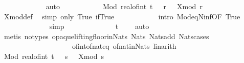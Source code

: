\begin{isabellebody}
\ \ \ \ \ \ \ \ \ \ \ \isamarkupfalse%
\ auto\isanewline
\ \ \ \ \ \ \ \ \isamarkupfalse%
\ \isamarkupfalse%
\ {\isachardoublequoteopen}{\isacharparenleft}{\kern0pt}Mod\ {\isacharparenleft}{\kern0pt}real{\isacharunderscore}{\kern0pt}of{\isacharunderscore}{\kern0pt}int\ {\isasymlfloor}t{\isasymrfloor}\ {\isacharplus}{\kern0pt}\ {}{\isacharparenright}{\kern0pt}{\isacharparenright}{\kern0pt}\ r\ {\isasymomega}\ {\isacharequal}{\kern0pt}\ X{\isacharunderscore}{\kern0pt}mod\ r\ {\isasymomega}{\isachardoublequoteclose}\isanewline
\ \ \ \ \ \ \ \ \ \ \isamarkupfalse%
\ X{\isacharunderscore}{\kern0pt}mod{\isacharunderscore}{\kern0pt}def\ \isamarkupfalse%
\ {\isacharparenleft}{\kern0pt}simp\ only{\isacharcolon}{\kern0pt}\ True\ if{\isacharunderscore}{\kern0pt}True{\isacharparenright}{\kern0pt}\isanewline
\ \ \ \ \ \ \ \ \ \ \isamarkupfalse%
\ {\isacharparenleft}{\kern0pt}intro\ Mod{\isacharunderscore}{\kern0pt}eq{\isacharunderscore}{\kern0pt}N{\isacharunderscore}{\kern0pt}inf{\isacharbrackleft}{\kern0pt}OF\ True{\isacharbrackright}{\kern0pt}{\isacharparenright}{\kern0pt}\isanewline
\ \ \ \ \ \ \ \ \ \ \ \ \isamarkupfalse%
\ simp\isanewline
\ \ \ \ \ \ \ \ \ \ \ \ \isamarkupfalse%
\ {\isacartoucheopen}t\ {\isasymin}\ {\isacharbraceleft}{\kern0pt}{}{\isachardot}{\kern0pt}{\isachardot}{\kern0pt}{\isacharbraceright}{\kern0pt}{\isacartoucheclose}\ \isamarkupfalse%
\ auto\isanewline
\ \ \ \ \ \ \ \ \ \ \ \ \ \isamarkupfalse%
\ {\isacharparenleft}{\kern0pt}metis\ {\isacharparenleft}{\kern0pt}no{\isacharunderscore}{\kern0pt}types{\isacharcomma}{\kern0pt}\ opaque{\isacharunderscore}{\kern0pt}lifting{\isacharparenright}{\kern0pt}floor{\isacharunderscore}{\kern0pt}in{\isacharunderscore}{\kern0pt}Nats\ Nats{\isacharunderscore}{\kern0pt}{}\ Nats{\isacharunderscore}{\kern0pt}add\ Nats{\isacharunderscore}{\kern0pt}cases\ \isanewline
\ \ \ \ \ \ \ \ \ \ \ \ \ \ \ \ \ \ \ \ of{\isacharunderscore}{\kern0pt}int{\isacharunderscore}{\kern0pt}of{\isacharunderscore}{\kern0pt}nat{\isacharunderscore}{\kern0pt}eq\ of{\isacharunderscore}{\kern0pt}nat{\isacharunderscore}{\kern0pt}in{\isacharunderscore}{\kern0pt}Nats{\isacharcomma}{\kern0pt}\ linarith{\isacharparenright}{\kern0pt}{\isacharplus}{\kern0pt}\isanewline
\ \ \ \ \ \ \ \ \ \ \isamarkupfalse%
\isanewline
\ \ \ \ \ \ \ \ \isamarkupfalse%
\ \isamarkupfalse%
\ {\isachardoublequoteopen}{\isacharparenleft}{\kern0pt}Mod\ {\isacharparenleft}{\kern0pt}real{\isacharunderscore}{\kern0pt}of{\isacharunderscore}{\kern0pt}int\ {\isasymlfloor}t{\isasymrfloor}\ {\isacharplus}{\kern0pt}\ {}{\isacharparenright}{\kern0pt}{\isacharparenright}{\kern0pt}\ s\ {\isasymomega}\ {\isacharequal}{\kern0pt}\ X{\isacharunderscore}{\kern0pt}mod\ s\ {\isasymomega}{\isachardoublequoteclose}\isanewline

\end{isabellebody}
